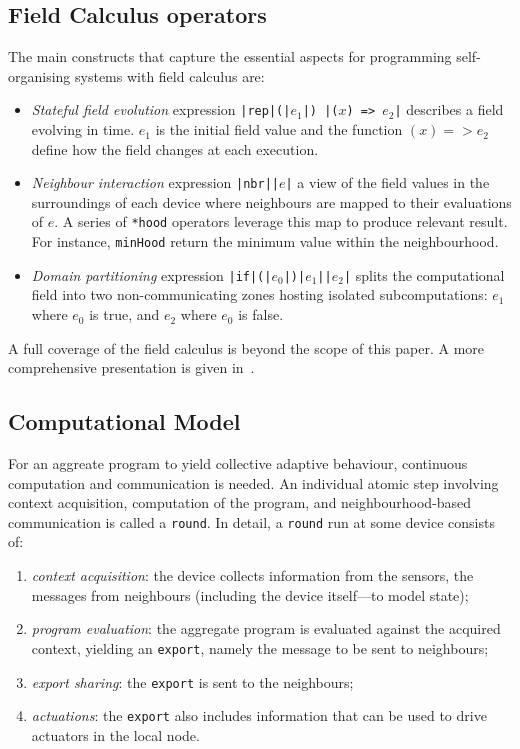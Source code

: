 \documentclass[conference]{IEEEtran}
\newcommand{\round}{\texttt{round}}
\newcommand{\export}{\texttt{export}}
\begin{document}
\subsection{Field Calculus operators}
The main constructs that capture the essential aspects for programming self-organising systems with field calculus are:
\begin{itemize}
  \item \textit{Stateful field evolution} expression \texttt{|{\color{teal}rep}|(|$e_1$|) {|($x$) => $e_2$|}} describes a field evolving in time. 
  $e_1$ is the initial field value and the function $(x) => e_2$ define how the field changes at each execution.
  \item \textit{Neighbour interaction} expression \texttt{|\color{teal}nbr|{|$e$|}} a view
  of the field values in the surroundings of each device where neighbours are
  mapped to their evaluations of $e$. A series of \texttt{*hood} operators leverage this map to produce relevant result. 
  For instance, \texttt{minHood} return the minimum value 
  within the neighbourhood.
  \item \textit{Domain partitioning} expression \texttt{|\color{teal}if|(|$e_0$|){|$e_1$|}{|$e_2$|}} splits the computational
  field into two non-communicating zones hosting isolated subcomputations:
  $e_1$ where $e_0$ is true, and $e_2$ where $e_0$ is false.
\end{itemize}
%
A full coverage of the field calculus is beyond the scope of this paper. A more comprehensive presentation is given in~\cite{DBLP:journals/jlap/ViroliBDACP19}.

\subsection{Computational Model}
%
For an aggreate program to yield collective adaptive behaviour, 
 continuous computation and communication is needed.
%
An individual atomic step 
 involving context acquisition,
 computation of the program,
 and neighbourhood-based communication 
 is called a \round{}.
%
In detail, a \round{} run at some device consists of:
\begin{enumerate}
  \item \emph{context acquisition}: the device collects information from the sensors, 
  the messages from neighbours
  (including the device itself---to model state);
  \item \emph{program evaluation}: the aggregate program is evaluated against the acquired context,
  yielding an \export{}, namely the message to be sent to neighbours;
  \item \emph{export sharing}: the \export{} is sent to the neighbours;
  \item \emph{actuations}: the \export{} also includes information that can be used to drive actuators in the local node.
\end{enumerate}
\end{document}
